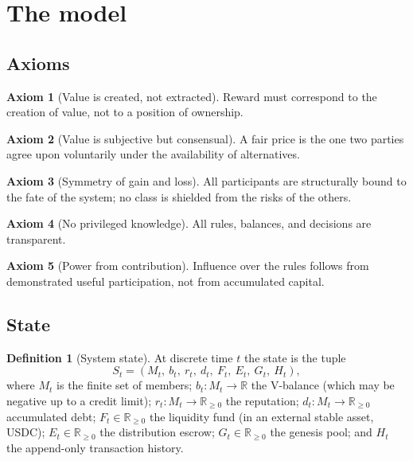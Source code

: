 \documentclass[11pt]{article}
\theoremstyle{plain}
\theoremstyle{definition}
\newtheorem{definition}{Definition}
\newtheorem{axiom}{Axiom}
\theoremstyle{remark}
\newcommand{\V}{\mathrm{V}}
\begin{document}
\section{The model}

\subsection{Axioms}\label{sec:axioms}

\begin{axiom}[Value is created, not extracted]\label{ax:create}
Reward must correspond to the creation of value, not to a position of ownership.
\end{axiom}
\begin{axiom}[Value is subjective but consensual]\label{ax:price}
A fair price is the one two parties agree upon voluntarily under the availability of alternatives.
\end{axiom}
\begin{axiom}[Symmetry of gain and loss]\label{ax:symmetry}
All participants are structurally bound to the fate of the system; no class is shielded from the risks of the others.
\end{axiom}
\begin{axiom}[No privileged knowledge]\label{ax:transparency}
All rules, balances, and decisions are transparent.
\end{axiom}
\begin{axiom}[Power from contribution]\label{ax:power}
Influence over the rules follows from demonstrated useful participation, not from accumulated capital.
\end{axiom}

\subsection{State}

\begin{definition}[System state]
At discrete time $t$ the state is the tuple
\[
S_t = (M_t,\ b_t,\ r_t,\ d_t,\ F_t,\ E_t,\ G_t,\ H_t),
\]
where $M_t$ is the finite set of members; $b_t: M_t \to \mathbb{R}$ the $\V$-balance (which may be negative up to a credit limit); $r_t: M_t \to \mathbb{R}_{\ge 0}$ the reputation; $d_t: M_t \to \mathbb{R}_{\ge 0}$ accumulated debt; $F_t \in \mathbb{R}_{\ge 0}$ the liquidity fund (in an external stable asset, USDC); $E_t \in \mathbb{R}_{\ge 0}$ the distribution escrow; $G_t \in \mathbb{R}_{\ge 0}$ the genesis pool; and $H_t$ the append-only transaction history.
\end{definition}
\end{document}
